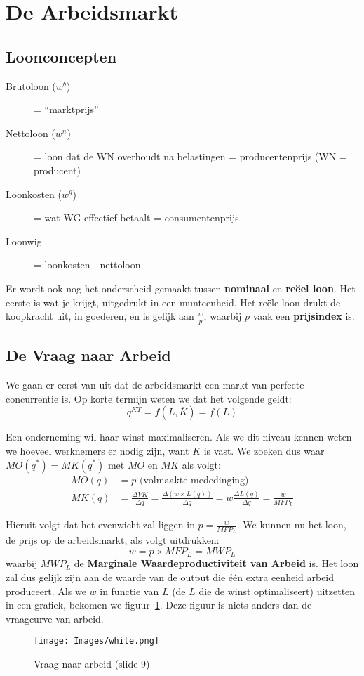 \section{De Arbeidsmarkt}
\subsection{Loonconcepten}
\begin{description}
   \item[Brutoloon ($w^b$)] = ``marktprijs''
   \item[Nettoloon ($w^n$)] = loon dat de WN overhoudt na belastingen = producentenprijs (WN = producent)
   \item[Loonkosten ($w^g$)] = wat WG effectief betaalt = consumentenprijs
   \item[Loonwig] = loonkosten - nettoloon
\end{description}

Er wordt ook nog het onderscheid gemaakt tussen \textbf{nominaal} en \textbf{re\"eel loon}. Het eerste is wat je krijgt, uitgedrukt in een munteenheid. Het re\"ele loon drukt de koopkracht uit, in goederen, en is gelijk aan $\frac{w}{p}$, waarbij $p$ vaak een \textbf{prijsindex} is.

\subsection{De Vraag naar Arbeid}

We gaan er eerst van uit dat de arbeidsmarkt een markt van perfecte concurrentie is. Op korte termijn weten we dat het volgende geldt:
\begin{equation}
   q^{KT} = f(L,\overline{K}) = f(L)
\end{equation}

Een onderneming wil haar winst maximaliseren. Als we dit niveau kennen weten we hoeveel werknemers er nodig zijn, want $K$ is vast. We zoeken dus waar $MO(q^*) = MK(q^*)$ met $MO$ en $MK$ als volgt:
\begin{align}
   MO(q) &= p \text{ (volmaakte mededinging)}\\
   MK(q) &= \frac{\Delta VK}{\Delta q} = \frac{\Delta (w \times L(q))}{\Delta q} = w \frac{\Delta L(q)}{\Delta q} = \frac{w}{MFP_L}
\end{align}

Hieruit volgt dat het evenwicht zal liggen in $p = \frac{w}{MFP_L}$. We kunnen nu het loon, de prijs op de arbeidsmarkt, als volgt uitdrukken:
\begin{equation}
   w = p \times MFP_L = MWP_L
\end{equation}
waarbij $MWP_L$ de \textbf{Marginale Waardeproductiviteit van Arbeid} is. Het loon zal dus gelijk zijn aan de waarde van de output die \'e\'en extra eenheid arbeid produceert. Als we $w$ in functie van $L$ (de $L$ die de winst optimaliseert) uitzetten in een grafiek, bekomen we figuur~\ref{fig:vraagNaarArbeid}. Deze figuur is niets anders dan de vraagcurve van arbeid.

\begin{figure}[htbp]
   \centering
   \texttt{[image: Images/white.png]}
   \caption{Vraag naar arbeid (slide 9)}
   \label{fig:vraagNaarArbeid}
\end{figure}
